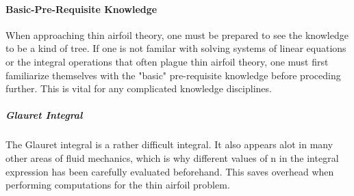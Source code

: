 \documentclass[a4paper, 12pt]{report}
\begin{document}
\paragraph{Basic-Pre-Requisite Knowledge}
When approaching thin airfoil theory, one must be prepared to see the knowledge to be a kind of tree. If one is not familar with solving systems of linear equations or the integral operations that often plague thin airfoil theory, one must first familiarize themselves with the "basic" pre-requisite knowledge before proceding further. This is vital for any complicated knowledge disciplines.

\subparagraph{Glauret Integral}
The Glauret integral is a rather difficult integral. It also appears alot in many other areas of fluid mechanics, which is why different values of n in the integral expression has been carefully evaluated beforehand. This saves overhead when performing computations for the thin airfoil problem.
\end{document}
